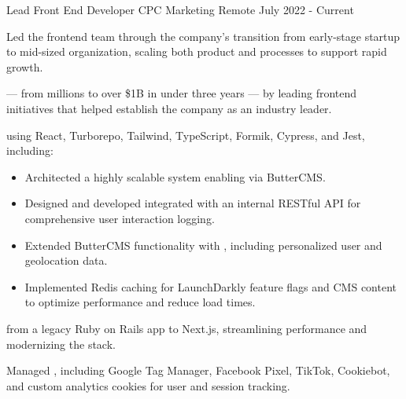 \begin{cventries}


\cventry
{Lead Front End Developer} %
{CPC Marketing} %
{Remote} %
{July 2022 - Current} %
{
  \begin{cvitems} %
    \item {Led the frontend team through the company's transition from early-stage startup to mid-sized organization, scaling both product and processes to support rapid growth.}
    \item { — from millions to over \$1B in under three years — by leading frontend initiatives that helped establish the company as an industry leader.}
    \item { using React, Turborepo, Tailwind, TypeScript, Formik, Cypress, and Jest, including:}
    \begin{itemize}[leftmargin=2.5ex]
      \vspace{.7mm}
      \setlength{\itemsep}{.9mm}
      \item {Architected a highly scalable system enabling  via ButterCMS.}
      \item {Designed and developed  integrated with an internal RESTful API for comprehensive user interaction logging.}
      \item {Extended ButterCMS functionality with , including personalized user and geolocation data.}
      \item {Implemented Redis caching for LaunchDarkly feature flags and CMS content to optimize performance and reduce load times.}
      \vspace{.5mm}
    \end{itemize}
    \item { from a legacy Ruby on Rails app to Next.js, streamlining performance and modernizing the stack.}
    \item {Managed , including Google Tag Manager, Facebook Pixel, TikTok, Cookiebot, and custom analytics cookies for user and session tracking.}
  \end{cvitems}
}


\end{cventries}
